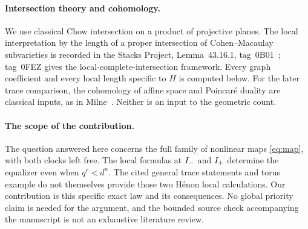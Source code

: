 \paragraph{Intersection theory and cohomology.}
We use classical Chow intersection on a product of projective planes.
The local interpretation by the length of a proper intersection of
Cohen--Macaulay subvarieties is recorded in the Stacks Project,
Lemma~43.16.1, tag~0B01~\cite{stacks2026intersection}; tag~0FEZ gives
the local-complete-intersection framework. Every graph coefficient and
every local length specific to $H$ is computed below. For the later trace
comparison, the cohomology of affine space and Poincar\'e duality are
classical inputs, as in Milne~\cite[Example~16.3, \S22 and
Theorem~24.1]{milne2013etale}. Neither is an input to the geometric count.

\paragraph{The scope of the contribution.}
The question answered here concerns the full family of nonlinear maps
\eqref{eq:map}, with both clocks left free. The local formulas at
$I_{-}$ and $I_{+}$ determine the equalizer even when $q^r<d^n$.
The cited general trace statements and torus example do not themselves
provide those two H\'enon local calculations. Our contribution is this
specific exact law and its consequences. No global priority claim is
needed for the argument, and the bounded source check accompanying the
manuscript is not an exhaustive literature review.
